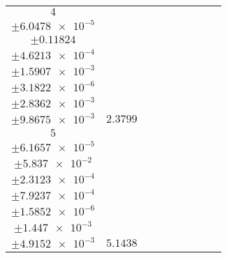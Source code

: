 \documentclass[8pt]{article}
\begin{document}
\begin{longtable}[l]{c c c c c c c c c}
$\num{4}$ & \begin{tabular}[c]{@{}c@{}}$\num{2.9818e-2}$ \\ $\pm\num{6.0478e-5}$\end{tabular} & \begin{tabular}[c]{@{}c@{}}$\num{0.49109}$ \\ $\pm\num{0.11824}$\end{tabular} & \begin{tabular}[c]{@{}c@{}}$\num{1.9093}$ \\ $\pm\num{4.6213e-4}$\end{tabular} & \begin{tabular}[c]{@{}c@{}}$\num{639.73}$ \\ $\pm\num{1.5907e-3}$\end{tabular} & \begin{tabular}[c]{@{}c@{}}$\num{1.2798}$ \\ $\pm\num{3.1822e-6}$\end{tabular} & \begin{tabular}[c]{@{}c@{}}$\num{1.1499}$ \\ $\pm\num{2.8362e-3}$\end{tabular} & \begin{tabular}[c]{@{}c@{}}$\num{4.1911}$ \\ $\pm\num{9.8675e-3}$\end{tabular} & $\num{2.3799}$\\
$\num{5}$ & \begin{tabular}[c]{@{}c@{}}$\num{6.0945e-2}$ \\ $\pm\num{6.1657e-5}$\end{tabular} & \begin{tabular}[c]{@{}c@{}}$\num{0.7304}$ \\ $\pm\num{5.837e-2}$\end{tabular} & \begin{tabular}[c]{@{}c@{}}$\num{5.2049}$ \\ $\pm\num{2.3123e-4}$\end{tabular} & \begin{tabular}[c]{@{}c@{}}$\num{643.01}$ \\ $\pm\num{7.9237e-4}$\end{tabular} & \begin{tabular}[c]{@{}c@{}}$\num{1.2864}$ \\ $\pm\num{1.5852e-6}$\end{tabular} & \begin{tabular}[c]{@{}c@{}}$\num{1.1765}$ \\ $\pm\num{1.447e-3}$\end{tabular} & \begin{tabular}[c]{@{}c@{}}$\num{4.2091}$ \\ $\pm\num{4.9152e-3}$\end{tabular} & $\num{5.1438}$\\

\end{longtable}
\end{document}
